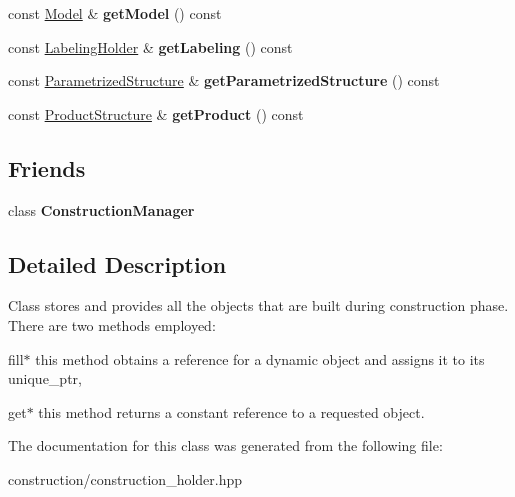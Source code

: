\begin{DoxyCompactItemize}
\item 
\hypertarget{classConstructionHolder_ae3174bf502fcb6c30603e477fe155162}{const \hyperlink{classModel}{\-Model} \& {\bfseries get\-Model} () const }\label{classConstructionHolder_ae3174bf502fcb6c30603e477fe155162}

\item 
\hypertarget{classConstructionHolder_ac6f6d7fc8c9d81a1527935fcbf22a4b1}{const \hyperlink{classLabelingHolder}{\-Labeling\-Holder} \& {\bfseries get\-Labeling} () const }\label{classConstructionHolder_ac6f6d7fc8c9d81a1527935fcbf22a4b1}

\item 
\hypertarget{classConstructionHolder_a1515c6ecb02c988c692650a965d97ef8}{const \hyperlink{classParametrizedStructure}{\-Parametrized\-Structure} \& {\bfseries get\-Parametrized\-Structure} () const }\label{classConstructionHolder_a1515c6ecb02c988c692650a965d97ef8}

\item 
\hypertarget{classConstructionHolder_a30ea2fee7b4923534c53b223116c9b86}{const \hyperlink{classProductStructure}{\-Product\-Structure} \& {\bfseries get\-Product} () const }\label{classConstructionHolder_a30ea2fee7b4923534c53b223116c9b86}

\end{DoxyCompactItemize}
\subsection*{\-Friends}
\begin{DoxyCompactItemize}
\item 
\hypertarget{classConstructionHolder_a08998c2fa463fca56ad572b99f4392b0}{class {\bfseries \-Construction\-Manager}}\label{classConstructionHolder_a08998c2fa463fca56ad572b99f4392b0}

\end{DoxyCompactItemize}


\subsection{\-Detailed \-Description}
\-Class stores and provides all the objects that are built during construction phase. \-There are two methods employed\-:
\begin{DoxyEnumerate}
\item fill$\ast$ this method obtains a reference for a dynamic object and assigns it to its unique\-\_\-ptr,
\end{DoxyEnumerate}

get$\ast$ this method returns a constant reference to a requested object. 

\-The documentation for this class was generated from the following file\-:\begin{DoxyCompactItemize}
\item 
construction/construction\-\_\-holder.\-hpp\end{DoxyCompactItemize}
